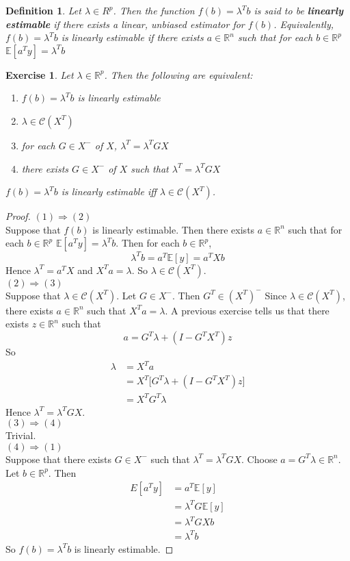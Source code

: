\documentclass[12pt]{amsart}
\newtheorem{defn}[thm]{Definition}
\newtheorem{ex}[thm]{Exercise}
\newcommand{\lam}{\lambda}
\newcommand{\E}{\mathbb{E}}
\newcommand{\R}{\mathbb{R}}
\newcommand{\MC}{\mathcal{C}}
\begin{document}
\begin{defn}
Let $\lam \in R^p$. Then the function $f(b) = \lam^T b$ is said to be \textbf{linearly estimable} if there exists a linear, unbiased estimator for $f(b)$. Equivalently, $f(b) = \lam^T b$ is linearly estimable if there exists $a \in \R^n$ such that for each $b \in \R^p$ $\E[a^Ty] = \lambda^Tb$
\end{defn}

\begin{ex}
Let $\lam \in \R^p$. Then the following are equivalent: 
\begin{enumerate}
\item $f(b) = \lam^T b$ is linearly estimable
\item $\lam \in \MC(X^T)$
\item for each $G  \in X^-$ of $X$, $\lam^T = \lam^TGX$
\item there exists $G \in X^-$  of $X$ such that $\lam^T = \lam^TGX$
\end{enumerate}
$f(b) = \lam^T b$ is linearly estimable iff $\lam \in \MC(X^T)$. 
\end{ex}

\begin{proof} $(1) \Rightarrow (2)$\\
Suppose that $f(b)$ is linearly estimable. Then there exists $a \in \R^n$ such that for each $b \in \R^p$ $\E[a^Ty] = \lambda^Tb$. Then for each $b \in \R^p$, $$\lambda^Tb = a^T\E[y] = a^TXb$$ Hence $\lam^T = a^TX$ and $X^Ta = \lam$. So $\lam \in \MC(X^T)$. \vspace{4mm} \\
$(2) \Rightarrow (3)$\\ 
Suppose that $\lam \in \MC(X^T)$. Let $G \in X^-$. Then $G^T \in (X^T)^-$ Since $\lam \in \MC(X^T)$, there exists $a \in \R^n$ such that $ X^Ta = \lam$. A previous exercise tells us that there exists $z \in \R^n$ such that $$a = G^T \lam + (I-G^TX^T)z$$
So 
\begin{align*}
\lam 
&= X^Ta \\
&= X^T \big[ G^T \lam + (I-G^TX^T)z \big] \\
&= X^TG^T \lam
\end{align*}
Hence $\lam^T = \lam^T G X$.\vspace{4mm}\\
$(3) \Rightarrow (4)$\\
Trivial.\vspace{4mm}\\
$(4) \Rightarrow (1)$\\
Suppose that there exists $G \in X^-$ such that $\lam^T = \lam^T G X$. Choose $a = G^T\lam \in \R^n$. Let $b \in \R^p$. Then 
\begin{align*}
E[a^Ty] 
&= a^T\E[y] \\
&= \lam^TG\E[y] \\ 
&= \lam^TGXb \\
&= \lam^Tb
\end{align*}
So $f(b) = \lam^Tb$ is linearly estimable.
\end{proof}
\end{document}
